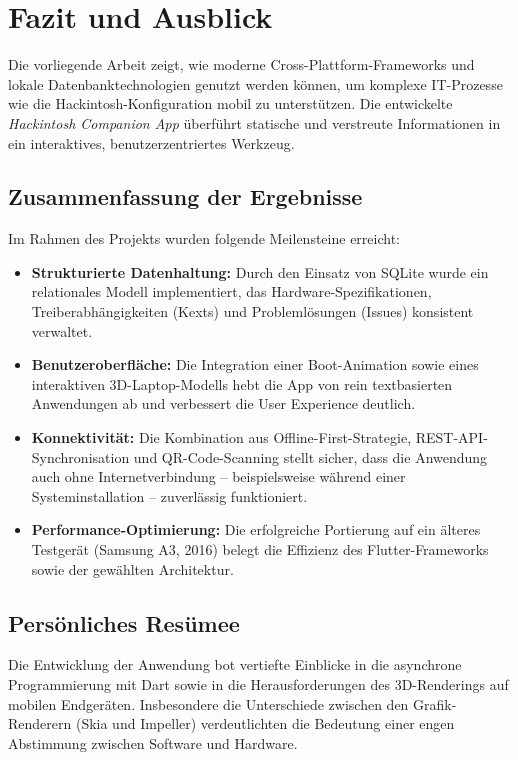 \chapter{Fazit und Ausblick}
\label{sec:fazit}

Die vorliegende Arbeit zeigt, wie moderne Cross-Plattform-Frameworks und lokale Datenbanktechnologien genutzt werden können, um komplexe IT-Prozesse wie die Hackintosh-Konfiguration mobil zu unterstützen. Die entwickelte \textit{Hackintosh Companion App} überführt statische und verstreute Informationen in ein interaktives, benutzerzentriertes Werkzeug.

\section{Zusammenfassung der Ergebnisse}
Im Rahmen des Projekts wurden folgende Meilensteine erreicht:
\begin{itemize}
    \item \textbf{Strukturierte Datenhaltung:} Durch den Einsatz von SQLite wurde ein relationales Modell implementiert, das Hardware-Spezifikationen, Treiberabhängigkeiten (Kexts) und Problemlösungen (Issues) konsistent verwaltet.
    
    \item \textbf{Benutzeroberfläche:} Die Integration einer Boot-Animation sowie eines interaktiven 3D-Laptop-Modells hebt die App von rein textbasierten Anwendungen ab und verbessert die User Experience deutlich.
    
    \item \textbf{Konnektivität:} Die Kombination aus Offline-First-Strategie, REST-API-Synchronisation und QR-Code-Scanning stellt sicher, dass die Anwendung auch ohne Internetverbindung – beispielsweise während einer Systeminstallation – zuverlässig funktioniert.
    
    \item \textbf{Performance-Optimierung:} Die erfolgreiche Portierung auf ein älteres Testgerät (Samsung A3, 2016) belegt die Effizienz des Flutter-Frameworks sowie der gewählten Architektur.
\end{itemize}

\section{Persönliches Resümee}
Die Entwicklung der Anwendung bot vertiefte Einblicke in die asynchrone Programmierung mit Dart sowie in die Herausforderungen des 3D-Renderings auf mobilen Endgeräten. Insbesondere die Unterschiede zwischen den Grafik-Renderern (Skia und Impeller) verdeutlichten die Bedeutung einer engen Abstimmung zwischen Software und Hardware.

